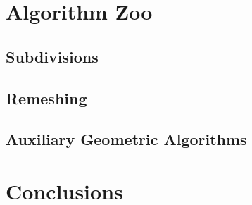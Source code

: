 \documentclass{egpubl}
\begin{document}
\section{Algorithm Zoo}

  \subsection{Subdivisions}
  

  \subsection{Remeshing}
  

  \subsection{Auxiliary Geometric Algorithms}
  

\section{Conclusions}


{\small


}
\end{document}
